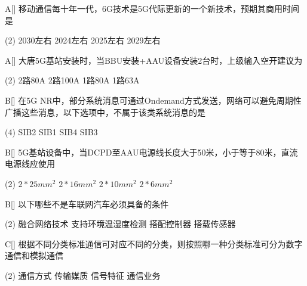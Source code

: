 \begin{choice}{A}[]
    移动通信每十年一代，6G技术是5G代际更新的一个新技术，预期其商用时间是
    \begin{tasks}(2)
        \task 2030左右
        \task 2024左右
        \task 2025左右
        \task 2029左右
    \end{tasks}
\end{choice}


\begin{choice}{A}[]
    大唐5G基站安装时，当BBU安装+AAU设备安装2台时，上级输入空开建议为
    \begin{tasks}(2)
        \task 2路80A
        \task 2路100A
        \task 1路80A
        \task 1路63A
    \end{tasks}
\end{choice}



\begin{choice}{B}[]
    在5G NR中，部分系统消息可通过Ondemand方式发送，网络可以避免周期性广播这些消息，以下选项中，不属于该类系统消息的是
    \begin{tasks}(4)
        \task SIB2
        \task SIB1
        \task SIB4
        \task SIB3
    \end{tasks}
\end{choice}


\begin{choice}{B}[]
    5G基站设备中，当DCPD至AAU电源线长度大于50米，小于等于80米，直流电源线应使用
    \begin{tasks}(2)
        \task $2*25mm^2$
        \task $2*16mm^2$
        \task $2*10mm^2$
        \task $2*6mm^2$
    \end{tasks}
\end{choice}


\begin{choice}{B}[]
    以下哪些不是车联网汽车必须具备的条件
    \begin{tasks}(2)
        \task 融合网络技术
        \task 支持环境温湿度检测
        \task 搭配控制器
        \task 搭载传感器
    \end{tasks}
\end{choice}


\begin{choice}{C}[]
    根据不同分类标准通信可对应不同的分类，则按照哪一种分类标准可分为数字通信和模拟通信
    \begin{tasks}(2)
        \task 通信方式
        \task 传输媒质
        \task 信号特征
        \task 通信业务
    \end{tasks}
\end{choice}


